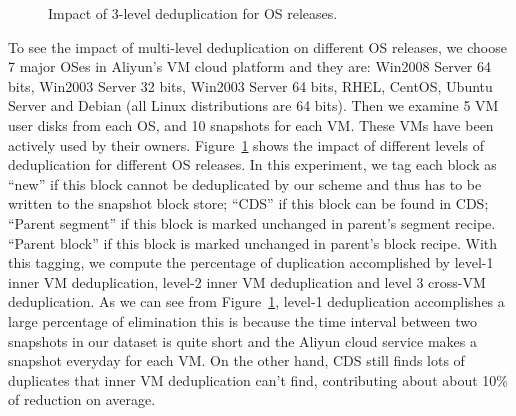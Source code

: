 \begin{figure}
  \centering
  \caption{Impact of 3-level deduplication for OS releases.}
  \label{fig:oscds}
\end{figure}

To see the impact of multi-level deduplication on different OS releases, we choose 7 major OSes in Aliyun's
VM cloud platform and they are: 
Win2008 Server 64 bits, Win2003 Server 32 bits, Win2003 Server 64 bits, RHEL, CentOS, Ubuntu Server and Debian (all Linux
distributions are 64 bits).
Then we examine 5 VM user disks from each OS, and 10 snapshots for each VM. These VMs have been actively used by their
owners. 
Figure~\ref{fig:oscds} shows the impact of different levels of deduplication for different OS releases.
In this experiment, we tag each block as  ``new''
if this block cannot be deduplicated by our scheme and thus has to be written to the snapshot block store;
``CDS''  if this block can be found  in CDS;
``Parent segment'' if  this block is marked unchanged in parent's segment recipe.
``Parent block'' if  this block is marked unchanged in parent's block recipe.
With this tagging, we compute the percentage of duplication accomplished by level-1 inner VM deduplication,
level-2 inner VM deduplication and level 3 cross-VM deduplication.
As we can see from Figure~\ref{fig:oscds}, level-1 deduplication accomplishes a large percentage of elimination
this is because the time interval between two snapshots in our dataset
is quite short and the Aliyun cloud service makes a snapshot  everyday  for each VM.
On the other hand,  CDS still finds lots of duplicates that inner VM deduplication can't find,
contributing about about 10\% of reduction on average.



